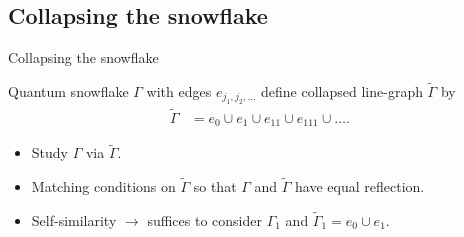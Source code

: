 \documentclass{beamer}
\begin{document}
  \subsection{Collapsing the snowflake}

  \begin{frame}{Collapsing the snowflake}
    \begin{definition}
      Quantum snowflake $\Gamma$ with edges $e_{j_1,j_2,\ldots}$ define collapsed line-graph $\widetilde{\Gamma}$ by
      \begin{align*}
        \widetilde{\Gamma} &= e_0 \cup e_1 \cup e_{11} \cup e_{111} \cup \ldots.
      \end{align*}
    \end{definition}
    \pause
    \begin{itemize}
      \item Study $\Gamma$ via $\widetilde{\Gamma}$.
      \item Matching conditions on $\widetilde{\Gamma}$ so that $\Gamma$ and $\widetilde{\Gamma}$ have equal reflection.
      \item Self-similarity $\to$ suffices to consider $\Gamma_1$ and $\widetilde{\Gamma}_1 = e_0 \cup e_1$.
    \end{itemize}
  \end{frame}
\end{document}
